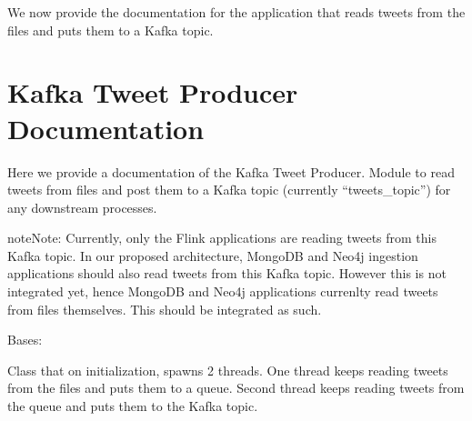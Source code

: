 \documentclass[letterpaper,10pt,english]{sphinxmanual}
\begin{document}
We now provide the documentation for the application that reads tweets from the files and puts them to a Kafka topic.


\section{Kafka Tweet Producer Documentation}
\label{\detokenize{kafka:kafka-tweet-producer-documentation}}
Here we provide a documentation of the Kafka Tweet Producer.
\label{\detokenize{kafka:module-kafka_tweets_producer}}
Module to read tweets from files and post them to a Kafka topic (currently “tweets\_topic”) for any downstream processes.

\begin{sphinxadmonition}{note}{Note:}
Currently, only the Flink applications are reading tweets from this Kafka topic.
In our proposed architecture, MongoDB and Neo4j ingestion applications should also read tweets from this Kafka topic.
However this is not integrated yet, hence MongoDB and Neo4j applications currenlty read tweets from files themselves.
This should be integrated as such.
\end{sphinxadmonition}

\begin{fulllineitems}
\label{\detokenize{kafka:kafka_tweets_producer.Producer}}
Bases: 

Class that on initialization, spawns 2 threads. One thread keeps reading tweets from the files and puts them to a queue.
Second thread keeps reading tweets from the queue and puts them to the Kafka topic.

\end{fulllineitems}

\end{document}
